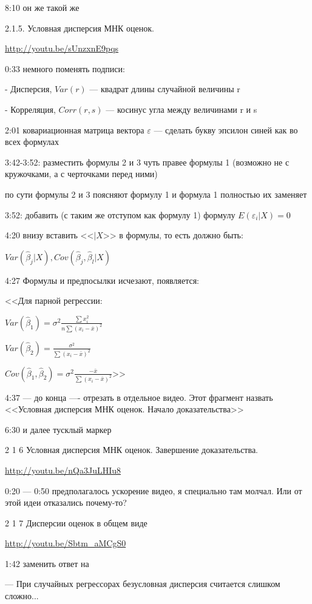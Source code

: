 \documentclass[12pt,a4paper]{article}
\begin{document}
8:10 он же такой же

2.1.5. Условная дисперсия МНК оценок. 

\url{http://youtu.be/sUnzxnE9pqs}

0:33 немного поменять подписи:

- Дисперсия, $Var(r)$ --- квадрат длины случайной величины r

- Корреляция, $Corr(r,s)$ --- косинус угла между величинами r и s

2:01 ковариационная матрица вектора $\varepsilon$ --- сделать букву эпсилон синей как во всех формулах

3:42-3:52: разместить формулы 2 и 3 чуть правее формулы 1 (возможно не с кружочками, а с черточками перед ними)

по сути формулы 2 и 3 поясняют формулу 1 и формула 1 полностью их заменяет

3:52: добавить (с таким же отступом как формулу 1) формулу $E(\varepsilon_i |X)=0$

4:20 внизу вставить <<$|X$>> в формулы, то есть должно быть:

$Var(\hat{\beta}_j|X), Cov(\hat{\beta}_j,\hat{\beta}_l|X)$

4:27 Формулы и предпосылки исчезают, появляется:

<<Для парной регрессии:

$Var(\hat{\beta}_1)=\sigma^2\frac{\sum x_i^2}{n\sum (x_i-\bar{x})^2}$

$Var(\hat{\beta}_2)=\frac{\sigma^2}{\sum (x_i-\bar{x})^2}$

$Cov(\hat{\beta}_1, \hat{\beta}_2)=\sigma^2\frac{-\bar{x}}{\sum (x_i-\bar{x})^2}$>>

4:37 --- до конца ---- отрезать в отдельное видео. Этот фрагмент назвать <<Условная дисперсия МНК оценок. Начало доказательства>>


6:30 и далее тусклый маркер


2 1 6 Условная дисперсия МНК оценок. Завершение доказательства.

\url{http://youtu.be/nQa3JuLHIu8}

0:20 --- 0:50 предполагалось ускорение видео, я специально там молчал. Или от этой идеи отказались почему-то?

2 1 7 Дисперсии оценок в общем виде

\url{http://youtu.be/Sbtm_aMCgS0}

1:42 заменить ответ на

--- При случайных регрессорах безусловная дисперсия считается слишком сложно...
\end{document}
